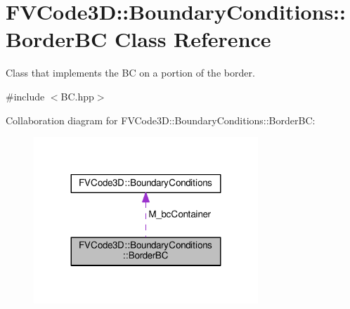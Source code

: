 \hypertarget{classFVCode3D_1_1BoundaryConditions_1_1BorderBC}{}\section{F\+V\+Code3D\+:\+:Boundary\+Conditions\+:\+:Border\+BC Class Reference}
\label{classFVCode3D_1_1BoundaryConditions_1_1BorderBC}


Class that implements the BC on a portion of the border.  




{\ttfamily \#include $<$B\+C.\+hpp$>$}



Collaboration diagram for F\+V\+Code3D\+:\+:Boundary\+Conditions\+:\+:Border\+BC\+:
\nopagebreak
\begin{figure}[H]
\begin{center}
\leavevmode
\includegraphics[width=239pt]{classFVCode3D_1_1BoundaryConditions_1_1BorderBC__coll__graph}
\end{center}
\end{figure}
